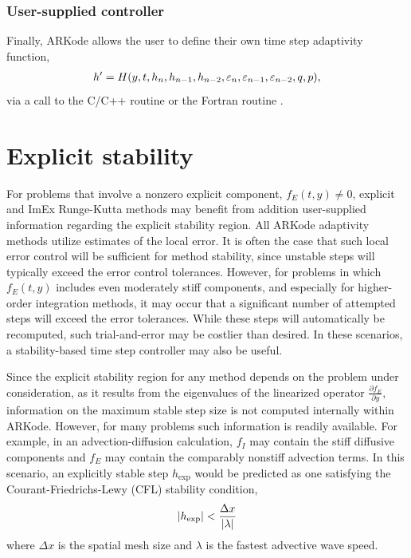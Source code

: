 \documentclass[letterpaper,10pt,english]{sphinxmanual}
\begin{document}
\subsubsection{User-supplied controller}
\label{Mathematics:mathematics-adaptivity-errorcontrol-user}\label{Mathematics:user-supplied-controller}
Finally, ARKode allows the user to define their own time step
adaptivity function,
\begin{gather}
\begin{split}h' = H(y, t, h_n, h_{n-1}, h_{n-2}, \varepsilon_n, \varepsilon_{n-1}, \varepsilon_{n-2}, q, p),\end{split}\notag
\end{gather}
via a call to the C/C++ routine {\hyperref[c_interface/User_callable:c.ARKodeSetAdaptivityFn]{\emph{}}} or
the Fortran routine {\hyperref[f_interface/Usage:f/_/FARKADAPTSET]{\emph{}}}.


\section{Explicit stability}
\label{Mathematics:mathematics-stability}\label{Mathematics:explicit-stability}
For problems that involve a nonzero explicit component,
\(f_E(t,y) \ne 0\), explicit and ImEx Runge-Kutta methods may
benefit from addition user-supplied information regarding the explicit
stability region.  All ARKode adaptivity methods utilize estimates of
the local error.  It is often the case that such local error control
will be sufficient for method stability, since unstable steps will
typically exceed the error control tolerances.  However, for problems
in which \(f_E(t,y)\) includes even moderately stiff components,
and especially for higher-order integration methods, it may occur that
a significant number of attempted steps will exceed the error
tolerances.  While these steps will automatically be recomputed, such
trial-and-error may be costlier than desired.  In these scenarios, a
stability-based time step controller may also be useful.

Since the explicit stability region for any method depends on the
problem under consideration, as it results from the eigenvalues of the
linearized operator \(\frac{\partial f_E}{\partial y}\),
information on the maximum stable step size is not computed internally
within ARKode.  However, for many problems such information is
readily available.  For example, in an advection-diffusion calculation,
\(f_I\) may contain the stiff diffusive components and
\(f_E\) may contain the comparably nonstiff advection terms.  In
this scenario, an explicitly stable step \(h_\text{exp}\) would be
predicted as one satisfying the Courant-Friedrichs-Lewy (CFL)
stability condition,
\begin{gather}
\begin{split}|h_\text{exp}| < \frac{\Delta x}{|\lambda|}\end{split}\notag
\end{gather}
where \(\Delta x\) is the spatial mesh size and \(\lambda\) is
the fastest advective wave speed.
\end{document}
